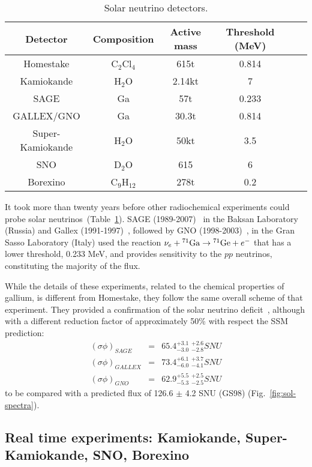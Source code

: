 \begin{table}
\caption{Solar neutrino detectors.}
\centering
\begin{tabular}{|c|c|c|c|c|c|}
  \hline
  Detector & Composition & Active mass & Threshold (MeV)  \\ 
  \hline
Homestake & C$_2$Cl$_4$ & 615t &  0.814 \\
Kamiokande & H$_2$O & 2.14kt &  7  \\
SAGE & Ga & 57t &  0.233 \\
GALLEX/GNO & Ga & 30.3t &  0.814  \\
Super-Kamiokande &  H$_2$O & 50kt &  3.5 \\
SNO & D$_2$O & 615 &  6\\
Borexino & C$_9$H$_{12}$ & 278t &  0.2  \\
  \hline
\end{tabular}

\label{tab:snudet}
\end{table}

It took more than twenty years before other radiochemical experiments could probe solar neutrinos~(Table~\ref{tab:snudet}). SAGE (1989-2007)~\cite{abdurashitov} in the Baksan Laboratory (Russia) and Gallex (1991-1997)~\cite{hampel}, followed by GNO (1998-2003)~\cite{altmann}, in the Gran Sasso Laboratory (Italy) used the reaction  $\nu_e  + {}^{71}{\rm Ga} \rightarrow {}^{71}{\rm Ge} + e^-$
that has a lower threshold, 0.233 MeV, and provides sensitivity to the $pp$ neutrinos, constituting the majority of the flux. 

While the details of these experiments, related to the chemical properties of gallium, is different from Homestake, they follow the same overall scheme of that experiment. They provided a confirmation of the solar neutrino deficit~\cite{abdurashitov,hampel,altmann,kaether}, although with a different reduction factor of approximately 50\% with respect the SSM prediction:
\begin{eqnarray}
(\sigma \phi)_{SAGE} & = & 65.4^{+3.1} _{-3.0} \; ^{+2.6} _{-2.8}  SNU \\
(\sigma \phi)_{GALLEX} & = & 73.4  ^{+6.1}_{-6.0} \; ^{+3.7} _{-4.1} SNU \\
(\sigma \phi)_{GNO} & = & 62.9  ^{+5.5} _{-5.3} \; ^{+2.5} _{-2.5} SNU 
\end{eqnarray}
to be compared with a predicted flux of 126.6 $\pm$ 4.2 SNU (GS98) (Fig.~\ref{fig:sol-spectra}).


\subsection{Real time experiments: Kamiokande, Super-Kamiokande, SNO, Borexino}

